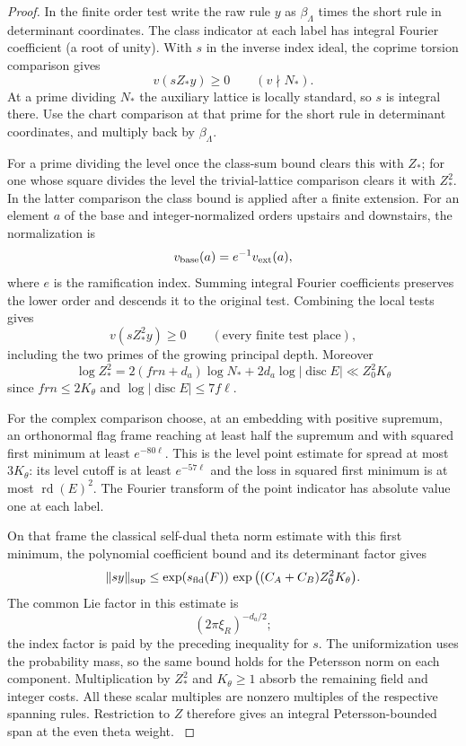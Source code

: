 \begin{proof}
In the finite order test write the raw rule \(y\) as
\(\beta_\Lambda\) times the short rule in determinant
coordinates. The class indicator at each label has integral
Fourier coefficient (a root of unity). With \(s\) in the inverse index ideal, the coprime torsion comparison gives 
\[
 v(sZ_*y)\ge0\qquad(v\nmid N_*).
\]
 At a prime dividing \(N_*\) the auxiliary
lattice is locally standard, so \(s\) is integral there.
Use the chart comparison at that prime for the short
rule in determinant coordinates, and multiply back by
\(\beta_\Lambda\).

For a prime dividing the level once
the class-sum bound clears this with \(Z_*\); for one
whose square divides the level the trivial-lattice
comparison clears it with \(Z_*^2\). In the latter comparison the class bound is applied after a finite extension. For an element \(a\) of the base and integer-normalized orders upstairs and downstairs, the normalization is
\[
 v_{\rm base}(a)=e^{-1}v_{\rm ext}(a),
\]
where \(e\) is the ramification index. Summing integral Fourier coefficients
preserves the lower order and descends it to the original
test. Combining the local tests gives
\[
 v(sZ_*^2y)\ge0\qquad(\text{every finite test place}),
\]
including the two primes of the growing principal depth. Moreover
\[
  \log Z_*^2
    =2(frn+d_a)\log N_*+2d_a\log|\operatorname{disc}E|
    \ll Z_0^2 K_\theta
\]
since \(frn\le2K_\theta\) and
\(\log|\operatorname{disc}E|\le7f\ell\).
\label{cor:deep-short-readings-2}

For the complex comparison choose, at an embedding with
positive supremum, an orthonormal flag frame reaching
at least half the supremum and with squared first minimum
at least \(e^{-80\ell}\). This is the level point
estimate for spread at most \(3K_\theta\): its level
cutoff is at least \(e^{-57\ell}\) and the loss in
squared first minimum is at most \(\operatorname{rd}(E)^2\).
The Fourier transform of the point indicator has absolute
value one at each label.

On that frame the classical
self-dual theta norm estimate with this first minimum,
the polynomial coefficient bound and its determinant factor
gives
\[
   \|sy\|_{\sup}\le
   \exp(s_{\rm fld}(F))\,
   \exp\big((C_A+C_B)Z_0^2 K_\theta\big).
\]
The common Lie factor in this estimate is
\[
 (2\pi\xi_R)^{-d_a/2};
\]
the index factor is paid
by the preceding inequality for \(s\). The uniformization
uses the probability mass, so the same bound holds for
the Petersson norm on each component. Multiplication by
\(Z_*^2\) and \(K_\theta\ge1\) absorb the remaining
field and integer costs. All these scalar multiples are
nonzero multiples of the respective spanning rules.
Restriction to \(Z\) therefore gives an integral
Petersson-bounded span at the even theta weight.
\label{cor:deep-short-readings-3}


\end{proof}
